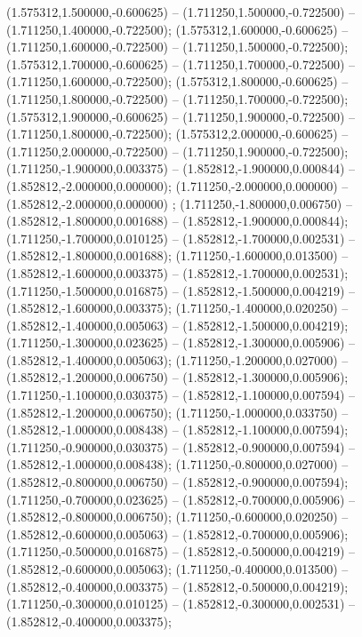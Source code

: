  (1.575312,1.500000,-0.600625) -- (1.711250,1.500000,-0.722500) -- (1.711250,1.400000,-0.722500);
 (1.575312,1.600000,-0.600625) -- (1.711250,1.600000,-0.722500) -- (1.711250,1.500000,-0.722500);
 (1.575312,1.700000,-0.600625) -- (1.711250,1.700000,-0.722500) -- (1.711250,1.600000,-0.722500);
 (1.575312,1.800000,-0.600625) -- (1.711250,1.800000,-0.722500) -- (1.711250,1.700000,-0.722500);
 (1.575312,1.900000,-0.600625) -- (1.711250,1.900000,-0.722500) -- (1.711250,1.800000,-0.722500);
 (1.575312,2.000000,-0.600625) -- (1.711250,2.000000,-0.722500) -- (1.711250,1.900000,-0.722500);
 (1.711250,-1.900000,0.003375) -- (1.852812,-1.900000,0.000844) -- (1.852812,-2.000000,0.000000);
 (1.711250,-2.000000,0.000000) -- (1.852812,-2.000000,0.000000) ;
 (1.711250,-1.800000,0.006750) -- (1.852812,-1.800000,0.001688) -- (1.852812,-1.900000,0.000844);
 (1.711250,-1.700000,0.010125) -- (1.852812,-1.700000,0.002531) -- (1.852812,-1.800000,0.001688);
 (1.711250,-1.600000,0.013500) -- (1.852812,-1.600000,0.003375) -- (1.852812,-1.700000,0.002531);
 (1.711250,-1.500000,0.016875) -- (1.852812,-1.500000,0.004219) -- (1.852812,-1.600000,0.003375);
 (1.711250,-1.400000,0.020250) -- (1.852812,-1.400000,0.005063) -- (1.852812,-1.500000,0.004219);
 (1.711250,-1.300000,0.023625) -- (1.852812,-1.300000,0.005906) -- (1.852812,-1.400000,0.005063);
 (1.711250,-1.200000,0.027000) -- (1.852812,-1.200000,0.006750) -- (1.852812,-1.300000,0.005906);
 (1.711250,-1.100000,0.030375) -- (1.852812,-1.100000,0.007594) -- (1.852812,-1.200000,0.006750);
 (1.711250,-1.000000,0.033750) -- (1.852812,-1.000000,0.008438) -- (1.852812,-1.100000,0.007594);
 (1.711250,-0.900000,0.030375) -- (1.852812,-0.900000,0.007594) -- (1.852812,-1.000000,0.008438);
 (1.711250,-0.800000,0.027000) -- (1.852812,-0.800000,0.006750) -- (1.852812,-0.900000,0.007594);
 (1.711250,-0.700000,0.023625) -- (1.852812,-0.700000,0.005906) -- (1.852812,-0.800000,0.006750);
 (1.711250,-0.600000,0.020250) -- (1.852812,-0.600000,0.005063) -- (1.852812,-0.700000,0.005906);
 (1.711250,-0.500000,0.016875) -- (1.852812,-0.500000,0.004219) -- (1.852812,-0.600000,0.005063);
 (1.711250,-0.400000,0.013500) -- (1.852812,-0.400000,0.003375) -- (1.852812,-0.500000,0.004219);
 (1.711250,-0.300000,0.010125) -- (1.852812,-0.300000,0.002531) -- (1.852812,-0.400000,0.003375);
